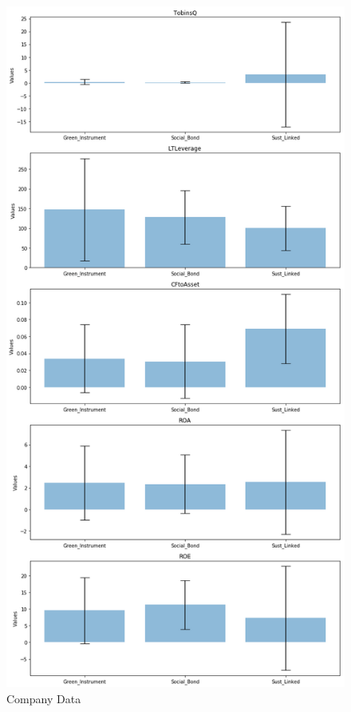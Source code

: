 \documentclass[12pt, a4paper]{article}
\begin{document}
\begin{figure}[H]
    \centering
    \includegraphics[width=0.8\linewidth, height=0.8\textheight, keepaspectratio]{Company_Data.png}
    \caption{Company Data}
\label{fig:CompanyData}
\end{figure}
\end{document}
